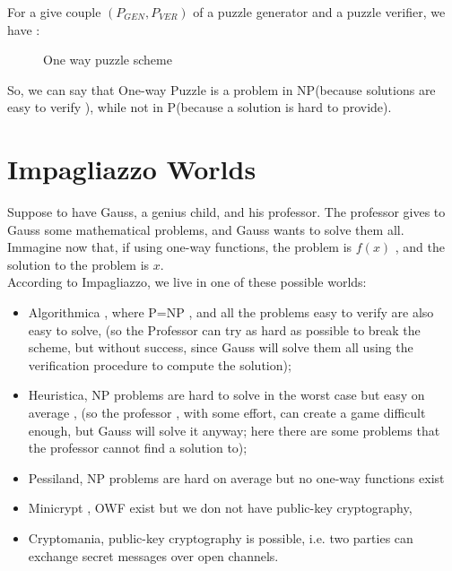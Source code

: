 For a give couple  $(P_{GEN},P_{VER})$ of a puzzle generator and a puzzle
verifier, we have :
\begin{figure}[h!]
   \centering
   \sdinit{}
   \caption{One way puzzle scheme}
   \label{fig:owp}
\end{figure}

So, we can say that One-way Puzzle is a problem in
NP(because solutions are easy to verify ), while not in P(because a solution is
hard to provide).\\

\section {  Impagliazzo Worlds}
Suppose to have Gauss, a genius child, and his professor. The professor gives to
Gauss some mathematical problems, and Gauss wants to solve them all.\\
Immagine now that, if using one-way functions, the problem is $f(x)$ , and the
solution to the problem is $x$.\\
According to Impagliazzo, we live in one of these possible worlds:
\begin{itemize}
    \item Algorithmica , where P=NP , and all the problems easy to verify
        are also easy to solve, (so the Professor can try as hard as possible to
        break the scheme, but without success, since Gauss will solve them all
        using the verification procedure to compute the solution);
    \item Heuristica, NP problems are hard to solve in the worst case but
        easy on average , (so the professor , with some effort, can create a
        game difficult enough, but Gauss will solve it anyway; here there are
        some problems that the professor cannot find a solution to);
    \item Pessiland, NP problems are hard on average but no one-way
        functions exist
    \item Minicrypt , OWF exist but we don not have public-key cryptography,
    \item Cryptomania, public-key cryptography is possible,  i.e. two
        parties can exchange secret messages over open channels.
\end{itemize}
    
